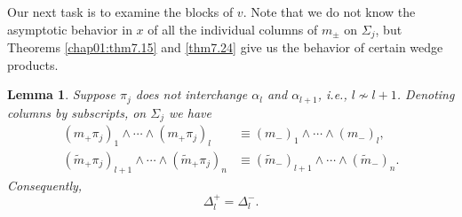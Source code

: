 \documentclass{surv-l}
\theoremstyle{plain}
\newtheorem{lemma}[theorem]{Lemma}
\theoremstyle{definition}
\numberwithin{equation}{chapter}
\begin{document}
Our next task is to examine the blocks of $v$. Note that we do not know the asymptotic behavior in $x$ of all the individual columns of $m_{\pm}$ on $\Sigma_{j}$, but Theorems \ref{chap01:thm7.15} and \ref{thm7.24} give us the behavior of certain wedge products.
\setcounter{theorem}{12}
\begin{lemma}\label{lam12.13}
Suppose $\pi_{j}$ does not interchange $\alpha_{l}$ and $\alpha_{l+1}$, i.e., $l\nsim l+1$. Denoting columns by subscripts, on $\Sigma_{j}$ we have
\setcounter{equation}{13}
\begin{align}\label{eq12.14}
(m_{+}\pi_{j})_{1}\wedge\cdots \wedge(m_{+}\pi_{j})_{l}&\equiv(m_{-})_{1}\wedge\cdots\wedge(m_{-})_{l},\\\label{eq12.15}
(\tilde{m}_{+}\pi_{j})_{l+1}\wedge\cdots \wedge(\tilde{m}_{+}\pi_{j})_{n}&\equiv(\tilde{m}_{-})_{l+1}\wedge\cdots \wedge(\tilde{m}_{-})_{n}.
\end{align}
Consequently,
\begin{equation}\label{eq12.16}
\Delta_{l}^{+}=\Delta_{l}^{-}.
\end{equation}
\end{lemma}
\end{document}
